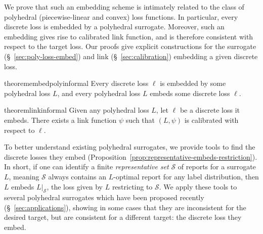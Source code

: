 \documentclass[11pt]{article}
\newcommand{\restatehack}[1]{}   %
\newcommand{\Sc}{\mathcal{S}}
\newtheorem{theorem}{Theorem}
\begin{document}


We prove that such an embedding scheme is intimately related to the class of polyhedral (piecewise-linear and convex) loss functions.
In particular, every discrete loss is embedded by a polyhedral surrogate.
Moreover, such an embedding gives rise to calibrated link function, and is therefore consistent with respect to the target loss.
Our proofs give explicit constructions for the surrogate (\S~\ref{sec:poly-loss-embed}) and link (\S~\ref{sec:calibration}) embedding a given discrete loss.


\restatehack{
  \begin{theorem}
    \label{thm:embed-poly-main}
    \label{thm:link-main}
  \end{theorem}}

\begin{restatable}{theorem}{embedpolyinformal}\label{thm:embed-poly-main}
  Every discrete loss $\ell$ is embedded by some polyhedral loss $L$, and every polyhedral loss $L$ embeds some discrete loss $\ell$.
\end{restatable}

\begin{restatable}{theorem}{linkinformal}\label{thm:link-main}
  Given any polyhedral loss $L$, let $\ell$ be a discrete loss it embeds. There exists a link function $\psi$ such that $(L,\psi)$ is calibrated with respect to $\ell$.
\end{restatable}

To better understand existing polyhedral surrogates, we provide tools to find the discrete losses they embed (Proposition~\ref{prop:representative-embeds-restriction}).
In short, if one can identify a finite \emph{representative set} $\Sc$ of reports for a surrogate $L$, meaning $\Sc$ always contains an $L$-optimal report for any label distribution, then $L$ embeds $L|_\Sc$, the loss given by $L$ restricting to $\Sc$.
We apply these tools to several polyhedral surrogates which have been proposed recently (\S~\ref{sec:applications}), showing in some cases that they are inconsistent for the desired target, but are consistent for a different target: the discrete loss they embed.
\end{document}
